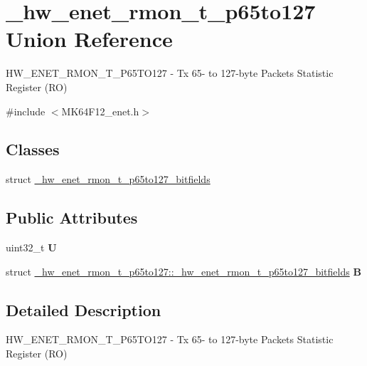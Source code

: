\hypertarget{union__hw__enet__rmon__t__p65to127}{}\section{\+\_\+hw\+\_\+enet\+\_\+rmon\+\_\+t\+\_\+p65to127 Union Reference}
\label{union__hw__enet__rmon__t__p65to127}


H\+W\+\_\+\+E\+N\+E\+T\+\_\+\+R\+M\+O\+N\+\_\+\+T\+\_\+\+P65\+T\+O127 -\/ Tx 65-\/ to 127-\/byte Packets Statistic Register (RO)  




{\ttfamily \#include $<$M\+K64\+F12\+\_\+enet.\+h$>$}

\subsection*{Classes}
\begin{DoxyCompactItemize}
\item 
struct \hyperlink{struct__hw__enet__rmon__t__p65to127_1_1__hw__enet__rmon__t__p65to127__bitfields}{\+\_\+hw\+\_\+enet\+\_\+rmon\+\_\+t\+\_\+p65to127\+\_\+bitfields}
\end{DoxyCompactItemize}
\subsection*{Public Attributes}
\begin{DoxyCompactItemize}
\item 
uint32\+\_\+t {\bfseries U}\hypertarget{union__hw__enet__rmon__t__p65to127_a78a2f06670325efc0b4ef57cd8029c3b}{}\label{union__hw__enet__rmon__t__p65to127_a78a2f06670325efc0b4ef57cd8029c3b}

\item 
struct \hyperlink{struct__hw__enet__rmon__t__p65to127_1_1__hw__enet__rmon__t__p65to127__bitfields}{\+\_\+hw\+\_\+enet\+\_\+rmon\+\_\+t\+\_\+p65to127\+::\+\_\+hw\+\_\+enet\+\_\+rmon\+\_\+t\+\_\+p65to127\+\_\+bitfields} {\bfseries B}\hypertarget{union__hw__enet__rmon__t__p65to127_a3bea6ed55cd1892bb92dc1ab7dab4bdb}{}\label{union__hw__enet__rmon__t__p65to127_a3bea6ed55cd1892bb92dc1ab7dab4bdb}

\end{DoxyCompactItemize}


\subsection{Detailed Description}
H\+W\+\_\+\+E\+N\+E\+T\+\_\+\+R\+M\+O\+N\+\_\+\+T\+\_\+\+P65\+T\+O127 -\/ Tx 65-\/ to 127-\/byte Packets Statistic Register (RO) 

